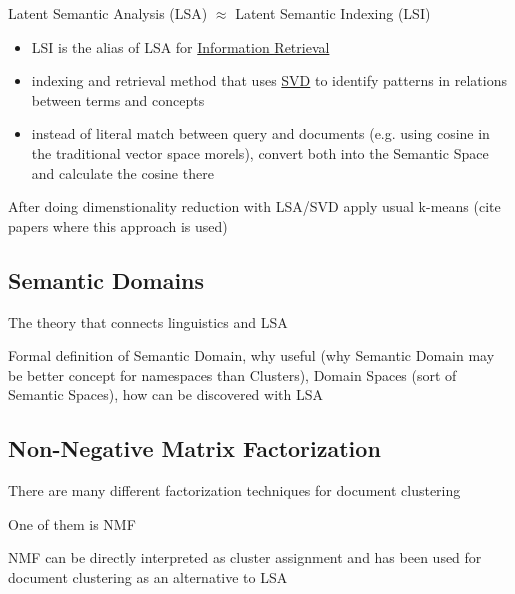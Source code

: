 Latent Semantic Analysis (LSA) $\approx$ Latent Semantic Indexing (LSI)

\begin{itemize}
\itemsep1pt\parskip0pt
\item
  LSI is the alias of LSA for \href{Information Retrieval}{Information   Retrieval}
\item
  indexing and retrieval method that uses
  \href{Singular Value Decomposition}{SVD} to identify patterns in
  relations between terms and concepts
\item
  instead of literal match between query and documents (e.g. using
  cosine in the traditional vector space morels), convert both into the
  Semantic Space and calculate the cosine there
\end{itemize}



After doing dimenstionality reduction with LSA/SVD apply usual k-means (cite papers where
this approach is used)



\subsection{Semantic Domains}

The theory that connects linguistics and LSA \cite{gliozzo2009semantic}

Formal definition of Semantic Domain, why useful (why Semantic Domain may
be better concept for namespaces than Clusters),
Domain Spaces (sort of Semantic Spaces), how can be discovered with LSA




\subsection{Non-Negative Matrix Factorization} \label{sec:nmf}

There are many different factorization techniques for document clustering \cite{osinski2006improving}

One of them is NMF \cite{lee1999nnmf}

NMF can be directly interpreted as cluster assignment and has been
used for document clustering as an alternative to LSA \cite{xu2003document}





